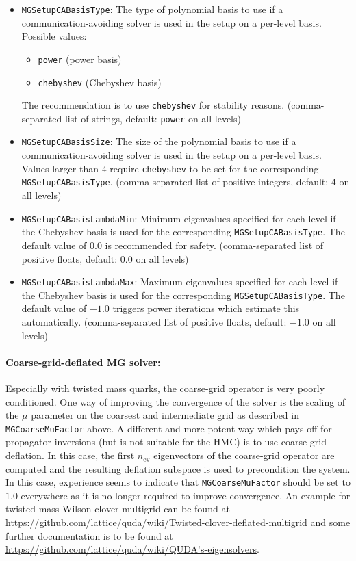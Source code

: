 \begin{itemize}
  \item{ \texttt{MGSetupCABasisType}: The type of polynomial basis to use if a communication-avoiding solver is used in the setup on a per-level basis. Possible values:
  \begin{itemize}
    \item \texttt{power} (power basis)
    \item \texttt{chebyshev} (Chebyshev basis)
  \end{itemize}
    The recommendation is to use \texttt{chebyshev} for stability reasons. (comma-separated list of strings, default: \texttt{power} on all levels)}
  \item{ \texttt{MGSetupCABasisSize}: The size of the polynomial basis to use if a communication-avoiding solver is used in the setup on a per-level basis. Values larger than $4$ require \texttt{chebyshev} to be set for the corresponding \texttt{MGSetupCABasisType}. (comma-separated list of positive integers, default: $4$ on all levels)}
  \item{ \texttt{MGSetupCABasisLambdaMin}: Minimum eigenvalues specified for each level if the Chebyshev basis is used for the corresponding \texttt{MGSetupCABasisType}. The default value of $0.0$ is recommended for safety. (comma-separated list of positive floats, default: $0.0$ on all levels)}
  \item{ \texttt{MGSetupCABasisLambdaMax}: Maximum eigenvalues specified for each level if the Chebyshev basis is used for the corresponding \texttt{MGSetupCABasisType}. The default value of $-1.0$ triggers power iterations which estimate this automatically. (comma-separated list of positive floats, default: $-1.0$ on all levels)}
\end{itemize}

\paragraph{Coarse-grid-deflated MG solver:}
Especially with twisted mass quarks, the coarse-grid operator is very poorly conditioned. One way of improving the convergence of the solver is the scaling of the $\mu$ parameter on the coarsest and intermediate grid as described in \texttt{MGCoarseMuFactor} above. A different and more potent way which pays off for propagator inversions (but is not suitable for the HMC) is to use coarse-grid deflation. In this case, the first $n_\mathrm{ev}$ eigenvectors of the coarse-grid operator are computed and the resulting deflation subspace is used to precondition the system. In this case, experience seems to indicate that \texttt{MGCoarseMuFactor} should be set to $1.0$ everywhere as it is no longer required to improve convergence.
An example for twisted mass Wilson-clover multigrid can be found at \url{https://github.com/lattice/quda/wiki/Twisted-clover-deflated-multigrid} and some further documentation is to be found at \url{https://github.com/lattice/quda/wiki/QUDA's-eigensolvers}.

